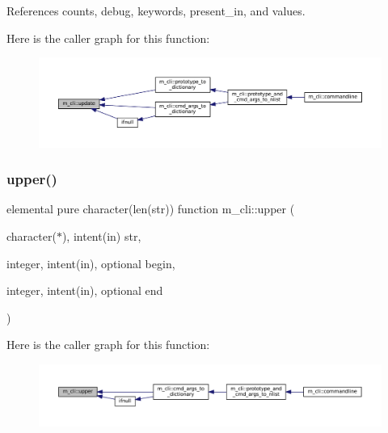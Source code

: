 References counts, debug, keywords, present\+\_\+in, and values.

Here is the caller graph for this function\+:\nopagebreak
\begin{figure}[H]
\begin{center}
\leavevmode
\includegraphics[width=350pt]{namespacem__cli_a9b7676d796e5cb878ecd9294b8a689cb_icgraph}
\end{center}
\end{figure}
\mbox{\label{namespacem__cli_aef6f54c9cb37251dfd664c0845186a40}} 
\subsubsection{\texorpdfstring{upper()}{upper()}}
{\footnotesize\ttfamily elemental pure character(len(str)) function m\+\_\+cli\+::upper (\begin{DoxyParamCaption}\item[{character($\ast$), intent(in)}]{str,  }\item[{integer, intent(in), optional}]{begin,  }\item[{integer, intent(in), optional}]{end }\end{DoxyParamCaption})\hspace{0.3cm}{\ttfamily [private]}}

Here is the caller graph for this function\+:\nopagebreak
\begin{figure}[H]
\begin{center}
\leavevmode
\includegraphics[width=350pt]{namespacem__cli_aef6f54c9cb37251dfd664c0845186a40_icgraph}
\end{center}
\end{figure}
\mbox{\label{namespacem__cli_a3c1b30406fc692841826be979726bb1b}} 
